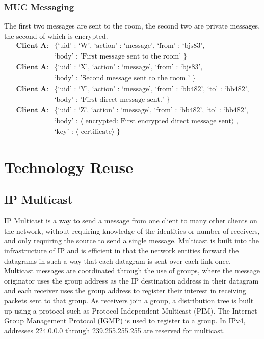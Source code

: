 \documentclass{article}
\begin{document}
\subsubsection{MUC Messaging}

The first two messages are sent to the room, the second two are private
messages, the second of which is encrypted.
\begin{align*}
\textbf{Client A}:& \text{\{ `uid' : `W', `action' : `message', `from' :
`bjs83',}\\
&\text{`body' : 'First message sent to the room' \}}\\
\textbf{Client A}:& \text{\{ `uid' : `X', `action' : `message', `from' :
`bjs83',}\\
&\text{`body' : 'Second message sent to the room.' \}}\\
\textbf{Client A}:& \text{\{ `uid' : `Y', `action' : `message', `from' : `bb482',
`to' : `bb482',}\\
&\text{`body' : 'First direct message sent.' \}}\\
\textbf{Client A}:& \text{\{ `uid' : `Z', `action' : `message', `from' : `bb482',
`to' : `bb482',}\\
&\text{`body' : $\langle$ encrypted: First encrypted direct message
sent$\rangle$ ,} \\
&\text{`key' : $\langle$ certificate$\rangle$ \}}
\end{align*}

\section{Technology Reuse}

\subsection{IP Multicast}

IP Multicast is a way to send a message from one client to many other clients on
the network, without requiring knowledge of the identities or number of
receivers, and only requiring the source to send a single message. Multicast is
built into the infrastructure of IP and is efficient in that the network
entities forward the datagrams in such a way that each datagram is sent over
each link once. Multicast messages are coordinated through the use of groups,
where the message originator uses the group address as the IP destination
address in their datagram and each receiver uses the group address to register
their interest in receiving packets sent to that group. As receivers join a
group, a distribution tree is built up using a protocol such as Protocol
Independent Multicast (PIM). The Internet Group Management Protocol (IGMP) is
used to register to a group. In IPv4, addresses 224.0.0.0 through
239.255.255.255 are reserved for multicast.
\end{document}
